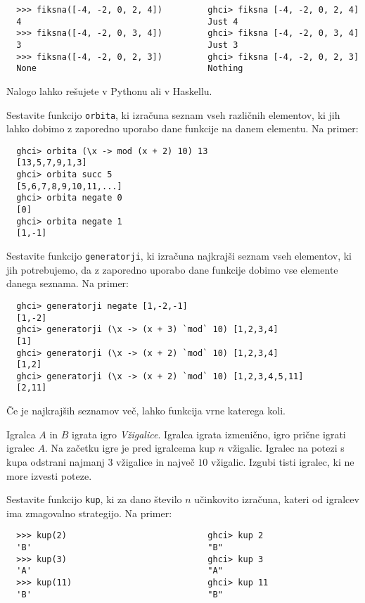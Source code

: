 \documentclass[arhiv]{../izpit}
\begin{document}
  \begin{verbatim}
  >>> fiksna([-4, -2, 0, 2, 4])         ghci> fiksna [-4, -2, 0, 2, 4]
  4                                     Just 4
  >>> fiksna([-4, -2, 0, 3, 4])         ghci> fiksna [-4, -2, 0, 3, 4]
  3                                     Just 3
  >>> fiksna([-4, -2, 0, 2, 3])         ghci> fiksna [-4, -2, 0, 2, 3]
  None                                  Nothing
  \end{verbatim}   
  Nalogo lahko rešujete v Pythonu ali v Haskellu.


\podnaloga
  Sestavite funkcijo \texttt{orbita}, ki izračuna seznam vseh različnih
  elementov, ki jih lahko dobimo z zaporedno uporabo dane funkcije na danem
  elementu. Na primer:
  \begin{verbatim}
  ghci> orbita (\x -> mod (x + 2) 10) 13
  [13,5,7,9,1,3]
  ghci> orbita succ 5
  [5,6,7,8,9,10,11,...]
  ghci> orbita negate 0
  [0]
  ghci> orbita negate 1
  [1,-1]
  \end{verbatim}

\podnaloga
  Sestavite funkcijo \texttt{generatorji}, ki izračuna najkrajši seznam vseh
  elementov, ki jih potrebujemo, da z zaporedno uporabo dane funkcije dobimo
  vse elemente danega seznama. Na primer:
  \begin{verbatim}
  ghci> generatorji negate [1,-2,-1]
  [1,-2]
  ghci> generatorji (\x -> (x + 3) `mod` 10) [1,2,3,4]
  [1]
  ghci> generatorji (\x -> (x + 2) `mod` 10) [1,2,3,4]
  [1,2]
  ghci> generatorji (\x -> (x + 2) `mod` 10) [1,2,3,4,5,11]
  [2,11] 
  \end{verbatim}
  Če je najkrajših seznamov več, lahko funkcija vrne katerega koli.



Igralca $A$ in $B$ igrata igro {\em Vžigalice}. Igralca igrata
izmenično, igro prične igrati igralec $A$. Na začetku igre je pred igralcema
kup $n$ vžigalic. Igralec na potezi s kupa odstrani najmanj $3$ vžigalice 
in največ $10$ vžigalic. Izgubi tisti igralec, ki ne more izvesti poteze.

\podnaloga
  Sestavite funkcijo \texttt{kup}, ki za dano število $n$ učinkovito izračuna,
  kateri od igralcev ima zmagovalno strategijo. Na primer:
  \begin{verbatim}
  >>> kup(2)                            ghci> kup 2 
  'B'                                   "B"
  >>> kup(3)                            ghci> kup 3 
  'A'                                   "A"
  >>> kup(11)                           ghci> kup 11 
  'B'                                   "B"
  \end{verbatim}
\end{document}
